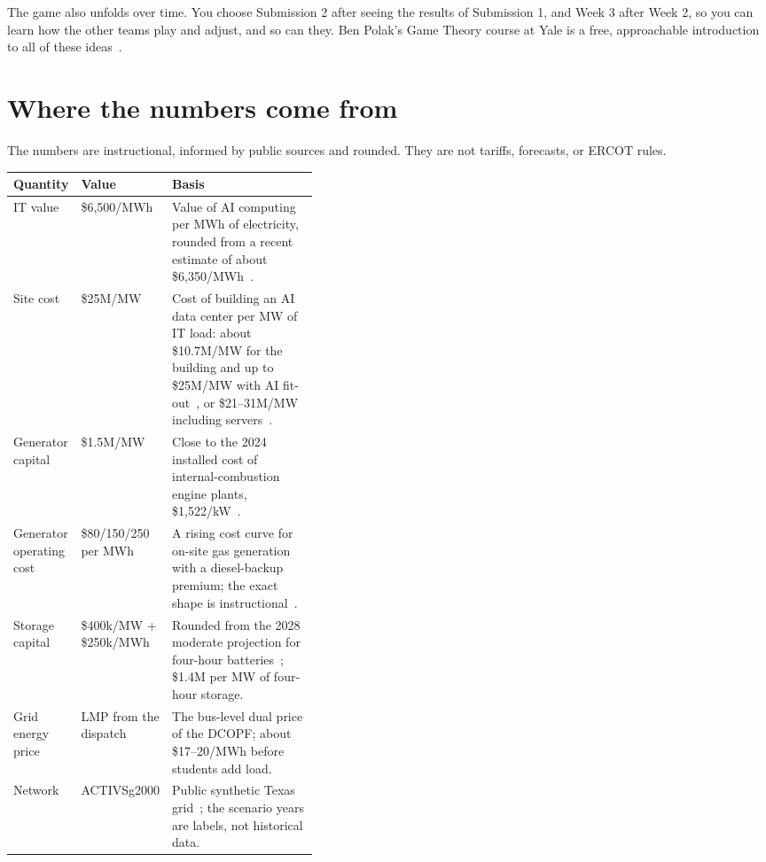 \documentclass[10pt]{article}
\begin{document}
The game also unfolds over time. You choose Submission 2 after seeing the
results of Submission 1, and Week 3 after Week 2, so you can learn how the other
teams play and adjust, and so can they. Ben Polak's Game Theory course at Yale
is a free, approachable introduction to all of these
ideas~\cite{polak2007gametheory}.

\section{Where the numbers come from}\label{app:numbers}

The numbers are instructional, informed by public sources and
rounded. They are not tariffs, forecasts, or ERCOT rules.

\begin{center}
\small
\renewcommand{\arraystretch}{1.15}
\begin{tabularx}{\linewidth}{@{}>{\raggedright\arraybackslash}p{0.2\linewidth} >{\raggedright\arraybackslash}p{0.2\linewidth} X@{}}
\toprule
Quantity & Value & Basis\\
\midrule
IT value & \$6,500/MWh & Value of AI computing per MWh of electricity, rounded from a recent estimate of about \$6,350/MWh~\cite{computeheat2026,iea2026ai}.\\
Site cost & \$25M/MW & Cost of building an AI data center per MW of IT load: about \$10.7M/MW for the building and up to \$25M/MW with AI fit-out~\cite{jll2026dc}, or \$21--31M/MW including servers~\cite{morganstanley2024dc}.\\
Generator capital & \$1.5M/MW & Close to the 2024 installed cost of internal-combustion engine plants, \$1,522/kW~\cite{eia2024generatorcosts}.\\
Generator operating cost & \$80/150/250 per MWh & A rising cost curve for on-site gas generation with a diesel-backup premium; the exact shape is instructional~\cite{eia2025heatrate}.\\
Storage capital & \$400k/MW + \$250k/MWh & Rounded from the 2028 moderate projection for four-hour batteries~\cite{nrel2023bess}; \$1.4M per MW of four-hour storage.\\
Grid energy price & LMP from the dispatch & The bus-level dual price of the DCOPF; about \$17--20/MWh before students add load.\\
Network & ACTIVSg2000 & Public synthetic Texas grid~\cite{activsg2000}; the scenario years are labels, not historical data.\\
\bottomrule
\end{tabularx}
\end{center}
\end{document}
